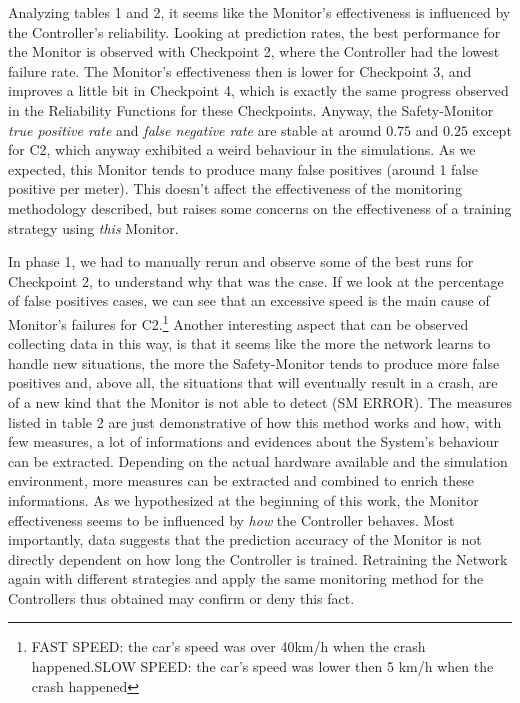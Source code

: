 Analyzing tables 1 and 2, it seems like the Monitor's effectiveness is influenced by the Controller's reliability. Looking at prediction rates, the best performance for the Monitor is observed with Checkpoint 2, where the Controller had the lowest failure rate. The Monitor's effectiveness then is lower for Checkpoint 3, and improves a little bit in Checkpoint 4, which is exactly the same progress observed in the Reliability Functions for these Checkpoints. Anyway, the Safety-Monitor \textsl{true positive rate} and \textsl{false negative rate} are stable at around $0.75$ and $0.25$ except for C2, which anyway exhibited a weird behaviour in the simulations. As we expected, this Monitor tends to produce many false positives (around 1 false positive per meter). This doesn't affect the effectiveness of the monitoring methodology described, but raises some concerns on the effectiveness of a training strategy using \textsl{this} Monitor.\newline

In phase 1, we had to manually rerun and observe some of the best runs for Checkpoint 2, to understand why that was the case. If we look at the percentage of false positives cases, we can see that an excessive speed is the main cause of Monitor's failures for C2.\footnote{FAST SPEED: the car's speed was over 40km/h when the crash happened.\newline SLOW SPEED: the car's speed was lower then 5 km/h when the crash happened}
Another interesting aspect that can be observed collecting data in this way, is that it seems like the more the network learns to handle new situations, the more the Safety-Monitor tends to produce more false positives and, above all, the situations that will eventually result in a crash, are of a new kind that the Monitor is not able to detect (SM ERROR).\newline
The measures listed in table 2 are just demonstrative of how this method works and how, with few measures, a lot of informations and evidences about the System's behaviour can be extracted. Depending on the actual hardware available and the simulation environment, more measures can be extracted and combined to enrich these informations.\newline
As we hypothesized at the beginning of this work, the Monitor effectiveness seems to be influenced by \textsl{how} the Controller behaves. Most importantly, data suggests that the prediction accuracy of the Monitor is not directly dependent on how long the Controller is trained. Retraining the Network again with different strategies and apply the same monitoring method for the Controllers thus obtained may confirm or deny this fact.

